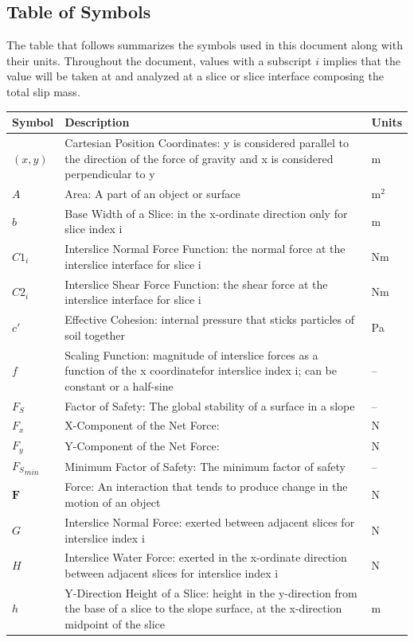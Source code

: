 \documentclass[12pt]{article}
\begin{document}
\subsection{Table of Symbols}
\label{Sec:ToS}
The table that follows summarizes the symbols used in this document along with their units. Throughout the document, values with a subscript $i$ implies that the value will be taken at and analyzed at a slice or slice interface composing the total slip mass.
\begin{longtabu}{l X[l] l}
\toprule
Symbol & Description & Units
\\
\midrule
$(x,y)$ & Cartesian Position Coordinates: y is considered parallel to the direction of the force of gravity and x is considered perpendicular to y & m
\\
$A$ & Area: A part of an object or surface & $\text{m}^{2}$
\\
$b$ & Base Width of a Slice: in the x-ordinate direction only for slice index i & m
\\
${C1_{i}}$ & Interslice Normal Force Function: the normal force at the interslice interface for slice i & Nm
\\
${C2_{i}}$ & Interslice Shear Force Function: the shear force at the interslice interface for slice i & Nm
\\
$c'$ & Effective Cohesion: internal pressure that sticks particles of soil together & Pa
\\
$f$ & Scaling Function: magnitude of interslice forces as a function of the x coordinatefor interslice index i; can be constant or a half-sine & --
\\
${F_{S}}$ & Factor of Safety: The global stability of a surface in a slope & --
\\
${F_{x}}$ & X-Component of the Net Force:  & N
\\
${F_{y}}$ & Y-Component of the Net Force:  & N
\\
${{F_{S}}_{min}}$ & Minimum Factor of Safety: The minimum factor of safety & --
\\
$\mathbf{F}$ & Force: An interaction that tends to produce change in the motion of an object & N
\\
$G$ & Interslice Normal Force: exerted between adjacent slices for interslice index i & N
\\
$H$ & Interslice Water Force: exerted in the x-ordinate direction between adjacent slices for interslice index i & N
\\
$h$ & Y-Direction Height of a Slice: height in the y-direction from the base of a slice to the slope surface, at the x-direction midpoint of the slice & m

\end{longtabu}
\end{document}
